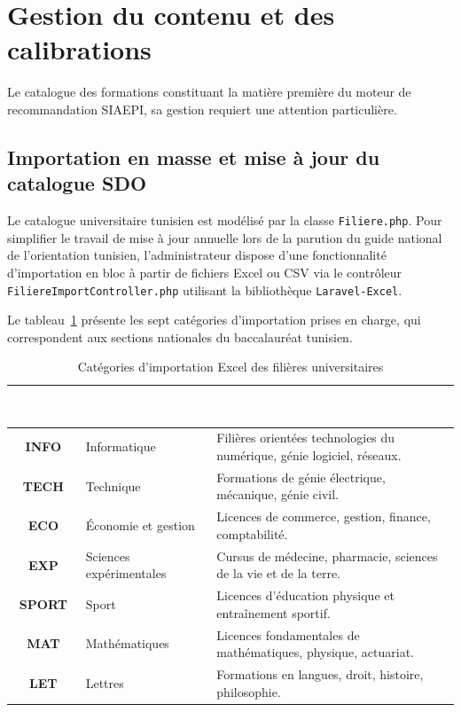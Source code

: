 \section{Gestion du contenu et des calibrations}

Le catalogue des formations constituant la matière première du moteur de recommandation SIAEPI, sa gestion requiert une attention particulière.

\subsection{Importation en masse et mise à jour du catalogue SDO}

Le catalogue universitaire tunisien est modélisé par la classe \texttt{Filiere.php}. Pour simplifier le travail de mise à jour annuelle lors de la parution du guide national de l'orientation tunisien, l'administrateur dispose d'une fonctionnalité d'importation en bloc à partir de fichiers Excel ou CSV via le contrôleur \texttt{FiliereImportController.php} utilisant la bibliothèque \texttt{Laravel-Excel}.

Le tableau~\ref{tab:categories_import} présente les sept catégories d'importation prises en charge, qui correspondent aux sections nationales du baccalauréat tunisien.

\begin{table}[H]
\centering
\small
\begin{tabular}{|c|p{4.5cm}|p{8cm}|}
\hline
\rowcolor{headercolor} 
\textcolor{white}{\textbf{Catégorie}} & \textcolor{white}{\textbf{Section du Baccalauréat}} & \textcolor{white}{\textbf{Description du fichier d'importation}} \\
\hline
\textbf{INFO} & Informatique & Filières orientées technologies du numérique, génie logiciel, réseaux. \\
\hline
\rowcolor{rowgray}
\textbf{TECH} & Technique & Formations de génie électrique, mécanique, génie civil. \\
\hline
\textbf{ECO} & Économie et gestion & Licences de commerce, gestion, finance, comptabilité. \\
\hline
\rowcolor{rowgray}
\textbf{EXP} & Sciences expérimentales & Cursus de médecine, pharmacie, sciences de la vie et de la terre. \\
\hline
\textbf{SPORT} & Sport & Licences d'éducation physique et entraînement sportif. \\
\hline
\rowcolor{rowgray}
\textbf{MAT} & Mathématiques & Licences fondamentales de mathématiques, physique, actuariat. \\
\hline
\textbf{LET} & Lettres & Formations en langues, droit, histoire, philosophie. \\
\hline
\end{tabular}
\caption{Catégories d'importation Excel des filières universitaires}
\label{tab:categories_import}
\end{table}

